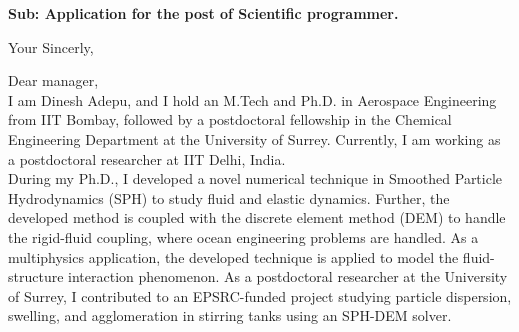 \documentclass[11pt,a4paper,roman]{moderncv}
\begin{document}
\date{\today}
\opening{\textbf{Sub: Application for the post of Scientific programmer.}}
\closing{Your Sincerly, \vspace{-1em}}


\makelettertitle



Dear manager,
\\
\vspace{1em}
I am Dinesh Adepu, and I hold an M.Tech and Ph.D. in Aerospace
Engineering from IIT Bombay, followed by a postdoctoral fellowship in
the Chemical Engineering Department at the University of
Surrey. Currently, I am working as a postdoctoral researcher at IIT
Delhi, India. \\


\vspace{1em}
During my Ph.D., I developed a novel numerical technique in Smoothed
Particle Hydrodynamics (SPH) to study fluid and elastic dynamics.
Further, the developed method is coupled with the discrete element
method (DEM) to handle the rigid-fluid coupling, where ocean
engineering problems are handled. As a multiphysics application, the
developed technique is applied to model the fluid-structure
interaction phenomenon.  As a postdoctoral researcher at the
University of Surrey, I contributed to an EPSRC-funded project
studying particle dispersion, swelling, and agglomeration in stirring
tanks using an SPH-DEM solver.\\
\end{document}
